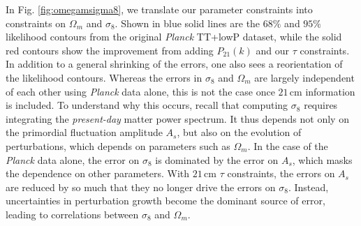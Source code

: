 \documentclass[twocolumn,aps,prd,nofootinbib,showpacs,superscriptaddress]{revtex4-1}
\begin{document}
In Fig. \ref{fig:omegamsigma8}, we translate our parameter constraints into constraints on $\Omega_m$ and $\sigma_8$. Shown in blue solid lines are the $68\%$ and $95\%$ likelihood contours from the original \emph{Planck} TT+lowP dataset, while the solid red contours show the improvement from adding $P_{21} (k)$ and our $\tau$ constraints. In addition to a general shrinking of the errors, one also sees a reorientation of the likelihood contours. Whereas the errors in $\sigma_8$ and $\Omega_m$ are largely independent of each other using \emph{Planck} data alone, this is not the case once $21\,\textrm{cm}$ information is included. To understand why this occurs, recall that computing $\sigma_8$ requires integrating the \emph{present-day} matter power spectrum. It thus depends not only on the primordial fluctuation amplitude $A_s$, but also on the evolution of perturbations, which depends on parameters such as $\Omega_m$. In the case of the \emph{Planck} data alone, the error on $\sigma_8$ is dominated by the error on $A_s$, which masks the dependence on other parameters. With $21\,\textrm{cm}$ $\tau$ constraints, the errors on $A_s$ are reduced by so much that they no longer drive the errors on $\sigma_8$. Instead, uncertainties in perturbation growth become the dominant source of error, leading to correlations between $\sigma_8$ and $\Omega_m$.
%
\end{document}
